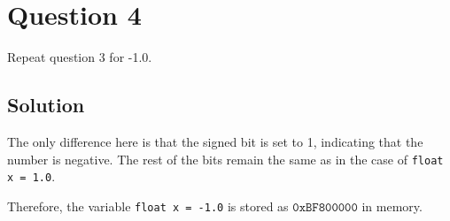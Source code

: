 \section*{Question 4}

Repeat question 3 for -1.0.

\subsection*{Solution}

The only difference here is that the signed bit is set to 1, indicating that the number is negative. The rest of the bits remain the same as in the case of \texttt{float x = 1.0}.

Therefore, the variable \texttt{float x = -1.0} is stored as \(\boxed{\texttt{0xBF800000}}\) in memory.
